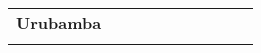 \begin{tabular}{lccccccccc}
	\textbf{Urubamba}                                                      	
	&\cellcolor[HTML]{FCC46C} 					&\cellcolor[HTML]{FCC46C}					&\cellcolor[HTML]{FCC46C}					&\cellcolor[HTML]{FCC46C}					&\cellcolor[HTML]{FCC46C}					&\cellcolor[HTML]{FCC46C}					&\cellcolor[HTML]{FCC46C}					&\cellcolor[HTML]{FCC46C}
	&\cellcolor[HTML]{FCC46C}\\	
	&\multicolumn{1}{l}{}                       &\multicolumn{1}{l}{}            &\multicolumn{1}{l}{}                         
	&\multicolumn{1}{l}{}                       &\multicolumn{1}{l}{}            &\multicolumn{1}{l}{}                       &\multicolumn{1}{l}{}                       &\multicolumn{1}{l}{}            			&\multicolumn{1}{l}{}    
\end{tabular}